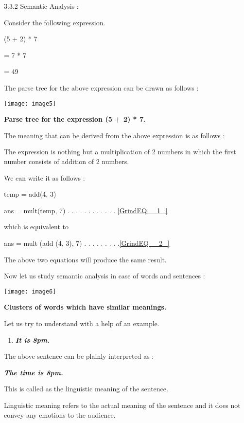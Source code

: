 \documentclass{article} %
\begin{document}
3.3.2 Semantic Analysis : 

Consider the following expression. 

(5 + 2) * 7

= 7 * 7 

= 49

The parse tree for the above expression can be drawn as follows : 

\noindent \texttt{[image: image5]}

\noindent \textbf{Parse tree for the expression (5 + 2) * 7.}

\noindent The meaning that can be derived from the  above expression is as follows :

\noindent The expression is nothing but a multiplication of 2 numbers in which the first number consists of addition of 2 numbers.

\noindent We can write it as follows :

\noindent temp = add(4, 3)

\noindent ans = mult(temp, 7) . . . . . . . . . . . . \eqref{GrindEQ__1_}

\noindent which is equivalent to

\noindent ans = mult (add (4, 3), 7) . . . . . . . . .\eqref{GrindEQ__2_} 

\noindent The above two equations will produce the same  result. 

Now let  us  study semantic analysis in case of words and sentences : 

\texttt{[image: image6]}

\textbf{Clusters of words which have similar meanings.}

\textbf{}

Let us try to understand with a help of an example.

\begin{enumerate}
\item  \textbf{\textit{It is 8pm.}}
\end{enumerate}

\noindent The above sentence can be plainly interpreted as :

\noindent \textbf{\textit{The time is 8pm.}}

\noindent This is called as the linguistic meaning of the sentence.

\noindent Linguistic meaning refers to the actual meaning of the sentence and it does not convey any emotions to the audience.
\end{document}
